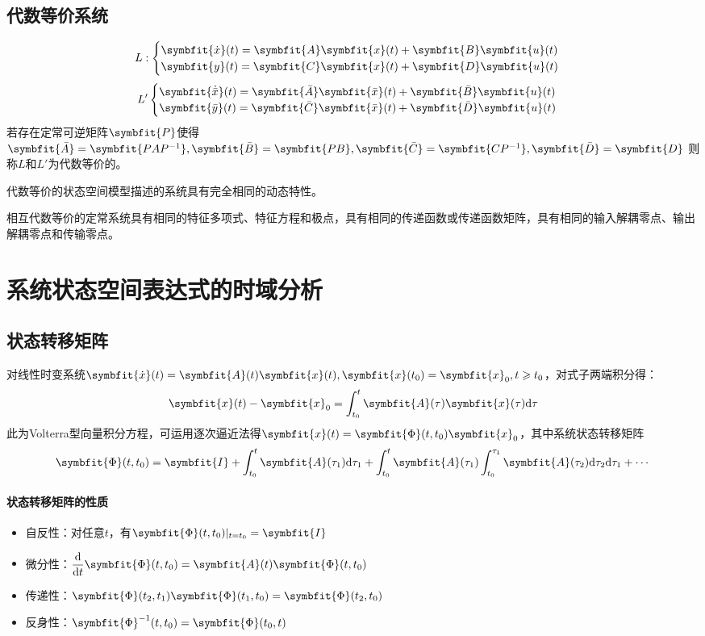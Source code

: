 \documentclass[11pt,a4paper]{ctexart}
\renewcommand{\d}{{\rm d}}
\newcommand{\bm}{\symbfit}
\begin{document}
    \subsection{代数等价系统}
        \[
        L:\begin{cases}
            \bm{\dot{x}}(t)=\bm{A}\bm{x}(t)+\bm{B}\bm{u}(t)\\
            \bm{y}(t)=\bm{C}\bm{x}(t)+\bm{D}\bm{u}(t)\\
        \end{cases}
        \]
        \[
        L'\begin{cases}
            \bm{\dot{\bar x}}(t)=\bm{\bar A}\bm{\bar x}(t)+\bm{\bar B}\bm{u}(t)\\
            \bm{\bar y}(t)=\bm{\bar C}\bm{\bar x}(t)+\bm{\bar D}\bm{u}(t)\\
        \end{cases}
        \]   
        若存在定常可逆矩阵$\bm{P}$使得$\bm{\bar A}=\bm{PAP^{-1}},\bm{\bar B}=\bm{PB},\bm{\bar C}=\bm{CP^{-1}},\bm{\bar D}=\bm{D}$
        则称$L$和$L'$为代数等价的。

        代数等价的状态空间模型描述的系统具有完全相同的动态特性。

        相互代数等价的定常系统具有相同的特征多项式、特征方程和极点，具有相同的传递函数或传递函数矩阵，具有相同的输入解耦零点、输出解耦零点和传输零点。
\newpage
\section{系统状态空间表达式的时域分析}
    \subsection{状态转移矩阵}
        对线性时变系统$\bm{\dot{x}}(t)=\bm{A}(t)\bm{x}(t),\bm{x}(t_0)=\bm{x}_0,t\geqslant t_0$，对式子两端积分得：
        \[
        \displaystyle\bm{x}(t)-\bm{x}_0=\int_{t_0}^t\bm{A}(\tau)\bm{x}(\tau)\d\tau
        \]
        此为Volterra型向量积分方程，可运用逐次逼近法得$\bm{x}(t)=\bm{\Phi}(t,t_0)\bm{x}_0$，其中系统状态转移矩阵
        \[
        \displaystyle\bm{\Phi}(t,t_0)=\bm{I}+\int_{t_0}^t\bm{A}(\tau_1)\d\tau_1+\int_{t_0}^t\bm{A}(\tau_1)\int_{t_0}^{\tau_1}\bm{A}(\tau_2)\d\tau_2\d\tau_1+\cdots
        \]
        \paragraph{状态转移矩阵的性质}
            \begin{itemize}
                \item 自反性：对任意$t$，有$\bm{\Phi}(t,t_0)|_{t=t_0}=\bm{I}$
                \item 微分性：$\dfrac{\d}{\d t}\bm{\Phi}(t,t_0)=\bm{A}(t)\bm{\Phi}(t,t_0)$
                \item 传递性：$\bm{\Phi}(t_2,t_1)\bm{\Phi}(t_1,t_0)=\bm{\Phi}(t_2,t_0)$
                \item 反身性：$\bm{\Phi}^{-1}(t,t_0)=\bm{\Phi}(t_0,t)$
            \end{itemize}
\end{document}
